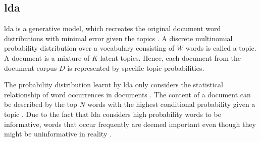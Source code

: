 \subsection{\acl*{lda}}\label{subsec:latent-dirichlet-allocation}

\ac{lda} is a generative model, which recreates the original document word distributions with minimal error given the topics \cite{topic_modeling2015, Top2Vec2020}.
A discrete multinomial probability distribution over a vocabulary consisting of $W$ words is called a topic.
A document is a mixture of $K$ latent topics.
Hence, each document from the document corpus $D$ is represented by specific topic probabilities.

The probability distribution learnt by \ac{lda} only considers the statistical relationship of word occurrences in documents \cite{Topic2Vec2015}.
The content of a document can be described by the top $N$ words with the highest conditional probability given a topic \cite{Topic2Vec2015}.
Due to the fact that \ac{lda} considers high probability words to be informative, words 
that occur frequently are deemed important even though they might be uninformative in reality \cite{Top2Vec2020, Topic2Vec2015}.
